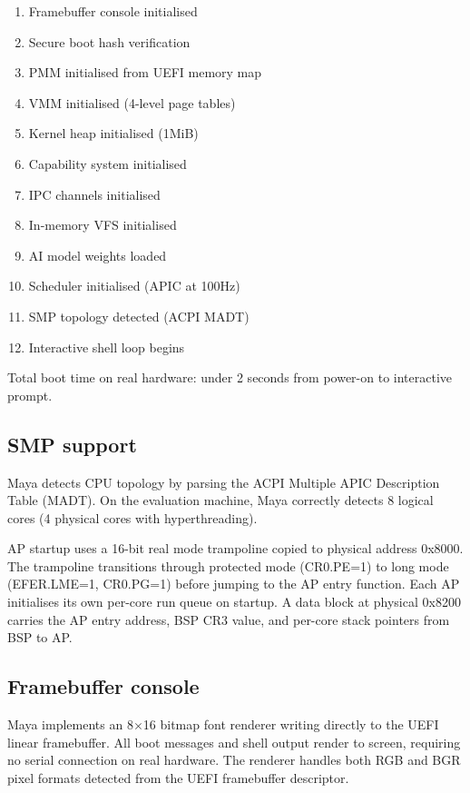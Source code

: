 \documentclass[letterpaper,twocolumn,10pt]{article}
\begin{document}
\begin{enumerate}
\item Framebuffer console initialised
\item Secure boot hash verification
\item PMM initialised from UEFI memory map
\item VMM initialised (4-level page tables)
\item Kernel heap initialised (1MiB)
\item Capability system initialised
\item IPC channels initialised
\item In-memory VFS initialised
\item AI model weights loaded
\item Scheduler initialised (APIC at 100Hz)
\item SMP topology detected (ACPI MADT)
\item Interactive shell loop begins
\end{enumerate}

Total boot time on real hardware: under 2
seconds from power-on to interactive prompt.

\subsection{SMP support}

Maya detects CPU topology by parsing the ACPI
Multiple APIC Description Table (MADT). On
the evaluation machine, Maya correctly detects
8 logical cores (4 physical cores with
hyperthreading).

AP startup uses a 16-bit real mode trampoline
copied to physical address 0x8000. The
trampoline transitions through protected mode
(CR0.PE=1) to long mode (EFER.LME=1, CR0.PG=1)
before jumping to the AP entry function. Each
AP initialises its own per-core run queue on
startup. A data block at physical 0x8200
carries the AP entry address, BSP CR3 value,
and per-core stack pointers from BSP to AP.

\subsection{Framebuffer console}

Maya implements an 8$\times$16 bitmap font
renderer writing directly to the UEFI linear
framebuffer. All boot messages and shell output
render to screen, requiring no serial connection
on real hardware. The renderer handles both
RGB and BGR pixel formats detected from the
UEFI framebuffer descriptor.
\end{document}
